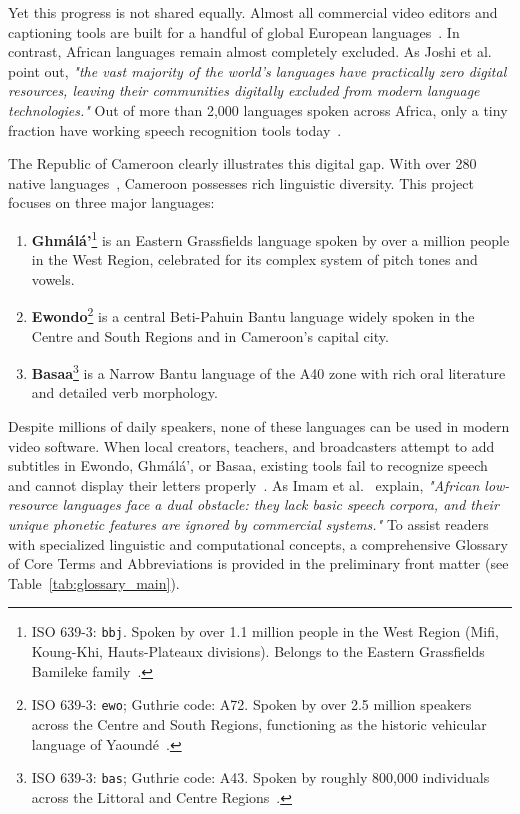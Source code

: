 \documentclass[a4paper,11pt]{article}
\begin{document}
Yet this progress is not shared equally. Almost all commercial video editors and captioning tools are built for a handful of global European languages~\cite{joshi2020state}. In contrast, African languages remain almost completely excluded. As Joshi et al.~\cite{joshi2020state} point out, \textit{"the vast majority of the world's languages have practically zero digital resources, leaving their communities digitally excluded from modern language technologies."} Out of more than 2,000 languages spoken across Africa, only a tiny fraction have working speech recognition tools today~\cite{eberhard2021ethnologue, nekoto2020participatory}.

The Republic of Cameroon clearly illustrates this digital gap. With over 280 native languages~\cite{lewis2009ethnologue, eberhard2021ethnologue}, Cameroon possesses rich linguistic diversity. This project focuses on three major languages:
\begin{enumerate}
    \item \textbf{Gh\textopeno m\'al\'a'}\footnote{ISO 639-3: \texttt{bbj}. Spoken by over 1.1 million people in the West Region (Mifi, Koung-Khi, Hauts-Plateaux divisions). Belongs to the Eastern Grassfields Bamileke family~\cite{watters2007bamileke}.} is an Eastern Grassfields language spoken by over a million people in the West Region, celebrated for its complex system of pitch tones and vowels.
    \item \textbf{Ewondo}\footnote{ISO 639-3: \texttt{ewo}; Guthrie code: A72. Spoken by over 2.5 million speakers across the Centre and South Regions, functioning as the historic vehicular language of Yaound\'e~\cite{essono2010ewondo}.} is a central Beti-Pahuin Bantu language widely spoken in the Centre and South Regions and in Cameroon's capital city.
    \item \textbf{Basaa}\footnote{ISO 639-3: \texttt{bas}; Guthrie code: A43. Spoken by roughly 800,000 individuals across the Littoral and Centre Regions~\cite{njiki2015grammaire, bitjaa2017dialectologie}.} is a Narrow Bantu language of the A40 zone with rich oral literature and detailed verb morphology.
\end{enumerate}

Despite millions of daily speakers, none of these languages can be used in modern video software. When local creators, teachers, and broadcasters attempt to add subtitles in Ewondo, Gh\textopeno m\'al\'a', or Basaa, existing tools fail to recognize speech and cannot display their letters properly~\cite{hedren2022challenges, imam2025automatic}. As Imam et al.~\cite{imam2025automatic} explain, \textit{"African low-resource languages face a dual obstacle: they lack basic speech corpora, and their unique phonetic features are ignored by commercial systems."} To assist readers with specialized linguistic and computational concepts, a comprehensive Glossary of Core Terms and Abbreviations is provided in the preliminary front matter (see Table~\ref{tab:glossary_main}).
\end{document}
